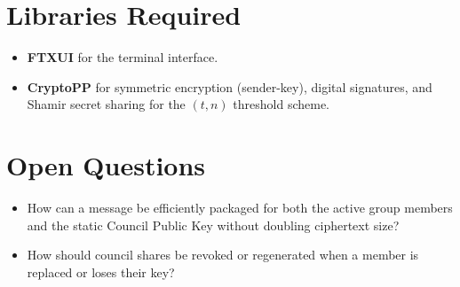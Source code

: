 \documentclass[sigconf]{acmart}
\begin{document}
\section{Libraries Required}
\begin{itemize}
	\item \textbf{FTXUI} for the terminal interface.
	\item \textbf{CryptoPP} for symmetric encryption (sender-key), digital signatures, and Shamir secret sharing for the $(t,n)$ threshold scheme.
\end{itemize}

\section{Open Questions}
\begin{itemize}
	\item How can a message be efficiently packaged for both the active group members and the static Council Public Key without doubling ciphertext size?
	\item How should council shares be revoked or regenerated when a member is replaced or loses their key?
\end{itemize}
\end{document}
